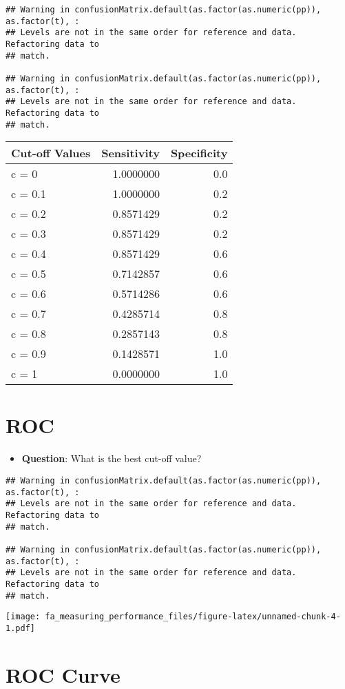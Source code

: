 \documentclass[
]{article}
\providecommand{\tightlist}{%
  \setlength{\itemsep}{0pt}\setlength{\parskip}{0pt}}
\begin{document}
\begin{verbatim}
## Warning in confusionMatrix.default(as.factor(as.numeric(pp)), as.factor(t), :
## Levels are not in the same order for reference and data. Refactoring data to
## match.

## Warning in confusionMatrix.default(as.factor(as.numeric(pp)), as.factor(t), :
## Levels are not in the same order for reference and data. Refactoring data to
## match.
\end{verbatim}

\begin{longtable}[]{@{}lrr@{}}
\toprule
Cut-off Values & Sensitivity & Specificity\tabularnewline
\midrule
\endhead
c = 0 & 1.0000000 & 0.0\tabularnewline
c = 0.1 & 1.0000000 & 0.2\tabularnewline
c = 0.2 & 0.8571429 & 0.2\tabularnewline
c = 0.3 & 0.8571429 & 0.2\tabularnewline
c = 0.4 & 0.8571429 & 0.6\tabularnewline
c = 0.5 & 0.7142857 & 0.6\tabularnewline
c = 0.6 & 0.5714286 & 0.6\tabularnewline
c = 0.7 & 0.4285714 & 0.8\tabularnewline
c = 0.8 & 0.2857143 & 0.8\tabularnewline
c = 0.9 & 0.1428571 & 1.0\tabularnewline
c = 1 & 0.0000000 & 1.0\tabularnewline
\bottomrule
\end{longtable}

\hypertarget{roc}{%
\section{ROC}\label{roc}}

\begin{itemize}
\tightlist
\item
  \textbf{Question}: What is the best cut-off value?
\end{itemize}

\begin{verbatim}
## Warning in confusionMatrix.default(as.factor(as.numeric(pp)), as.factor(t), :
## Levels are not in the same order for reference and data. Refactoring data to
## match.

## Warning in confusionMatrix.default(as.factor(as.numeric(pp)), as.factor(t), :
## Levels are not in the same order for reference and data. Refactoring data to
## match.
\end{verbatim}

\texttt{[image: fa\_measuring\_performance\_files/figure-latex/unnamed-chunk-4-1.pdf]}

\hypertarget{roc-curve}{%
\section{ROC Curve}\label{roc-curve}}
\end{document}

